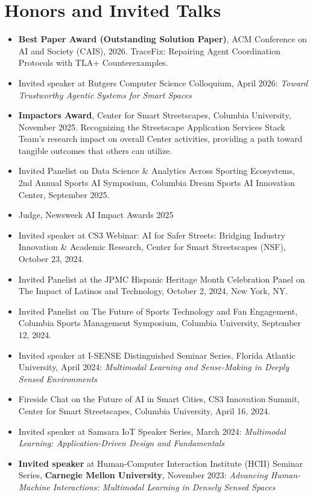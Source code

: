 \documentclass[12pt]{article}
\begin{document}
\section{Honors and Invited Talks}
\begin{itemize}
    \item {\bf Best Paper Award (Outstanding Solution Paper)}, ACM Conference on AI and Society (CAIS), 2026. TraceFix: Repairing Agent Coordination Protocols with TLA+ Counterexamples.
    \item Invited speaker at Rutgers Computer Science Colloquium, April 2026: \emph{Toward Trustworthy Agentic Systems for Smart Spaces}
    \item {\bf Impactors Award}, Center for Smart Streetscapes, Columbia University, November 2025. Recognizing the Streetscape Application Services Stack Team's research impact on overall Center activities, providing a path toward tangible outcomes that others can utilize.
    \item Invited Panelist on Data Science \& Analytics Across Sporting Ecosystems, 2nd Annual Sports AI Symposium, Columbia Dream Sports AI Innovation Center, September 2025.
    \item Judge, Newsweek AI Impact Awards 2025
    \item Invited speaker at CS3 Webinar: AI for Safer Streets: Bridging Industry Innovation \& Academic Research, Center for Smart Streetscapes (NSF), October 23, 2024.
    \item Invited Panelist at the JPMC Hispanic Heritage Month Celebration Panel on The Impact of Latinos and Technology, October 2, 2024, New York, NY.
    \item Invited Panelist on The Future of Sports Technology and Fan Engagement, Columbia Sports Management Symposium, Columbia University, September 12, 2024.
    \item Invited speaker at I-SENSE Distinguished Seminar Series, Florida Atlantic University, April 2024: \emph{Multimodal Learning and Sense-Making in Deeply Sensed Environments}
    \item Fireside Chat on the Future of AI in Smart Cities, CS3 Innovation Summit, Center for Smart Streetscapes, Columbia University, April 16, 2024.
    \item Invited speaker at Samsara IoT Speaker Series, March 2024: \emph{Multimodal Learning: Application-Driven Design and Fundamentals}
    \item {\bf Invited speaker} at Human-Computer Interaction Institute (HCII) Seminar Series, {\bf Carnegie Mellon University}, November 2023: \emph{Advancing Human-Machine Interactions: Multimodal Learning in Densely Sensed Spaces}

\end{itemize}
\end{document}
